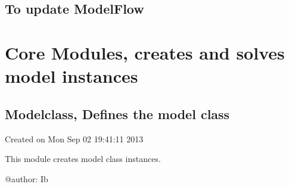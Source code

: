 \documentclass[letterpaper,10pt,english]{sphinxmanual}
\begin{document}
\section{To update ModelFlow}
\label{\detokenize{index:to-update-modelflow}}
\begin{sphinxVerbatim}[commandchars=\\\{\}]
        
\end{sphinxVerbatim}


\chapter{Core Modules, creates and solves model instances}
\label{\detokenize{index:core-modules-creates-and-solves-model-instances}}

\section{Modelclass, Defines the model class}
\label{\detokenize{index:module-modelclass}}\label{\detokenize{index:modelclass-defines-the-model-class}}
\sphinxAtStartPar
Created on Mon Sep 02 19:41:11 2013

\sphinxAtStartPar
This module creates model class instances.

\sphinxAtStartPar
@author: Ib
\end{document}
